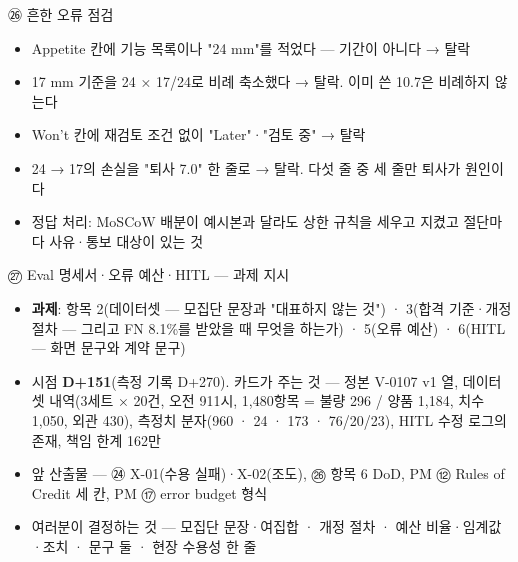 \begin{frame}{㉖ 흔한 오류 점검}
\begin{itemize}
\item Appetite 칸에 기능 목록이나 "24 mm"를 적었다 — 기간이 아니다 → 탈락
\item 17 mm 기준을 24 × 17/24로 비례 축소했다 → 탈락. 이미 쓴 10.7은 비례하지 않는다
\item Won't 칸에 재검토 조건 없이 "Later"·"검토 중" → 탈락
\item 24 → 17의 손실을 "퇴사 7.0" 한 줄로 → 탈락. 다섯 줄 중 세 줄만 퇴사가 원인이다
\item 정답 처리: MoSCoW 배분이 예시본과 달라도 상한 규칙을 세우고 지켰고 절단마다 사유·통보 대상이 있는 것
\end{itemize}
\end{frame}

\begin{frame}{㉗ Eval 명세서·오류 예산·HITL — 과제 지시}
\begin{itemize}
\item \textbf{과제}: 항목 2(데이터셋 — 모집단 문장과 "대표하지 않는 것") · 3(합격 기준·개정 절차 — 그리고 FN 8.1\%를 받았을 때 무엇을 하는가) · 5(오류 예산) · 6(HITL — 화면 문구와 계약 문구)
\item 시점 \textbf{D+151}(측정 기록 D+270). 카드가 주는 것 — 정본 V-01\til{}07 v1 열, 데이터셋 내역(3세트 × 20건, 오전 9\til{}11시, 1,480항목 = 불량 296 / 양품 1,184, 치수 1,050, 외관 430), 측정치 분자(960 · 24 · 173 · 76/20/23), HITL 수정 로그의 존재, 책임 한계 162만
\item 앞 산출물 — ㉔ X-01(수용 실패)·X-02(조도), ㉖ 항목 6 DoD, PM ⑫ Rules of Credit 세 칸, PM ⑰ error budget 형식
\item 여러분이 결정하는 것 — 모집단 문장·여집합 · 개정 절차 · 예산 비율·임계값·조치 · 문구 둘 · 현장 수용성 한 줄
\end{itemize}
\end{frame}

